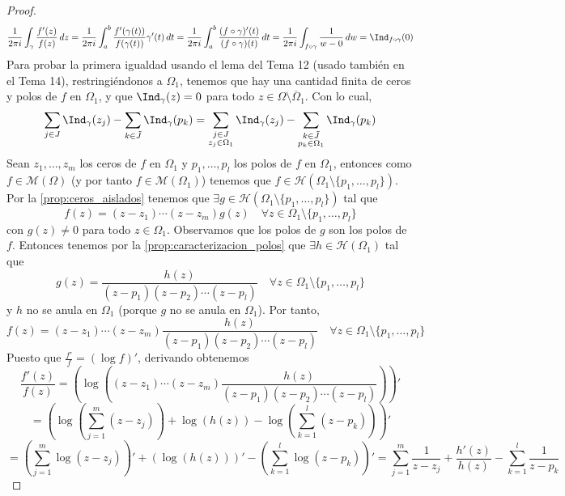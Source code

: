 \begin{proof}
    \[
        \frac{1}{2 \pi i} \int_{\gamma} \frac{f'(z)}{f(z)} \, dz = \frac{1}{2 \pi i} \int_{a}^{b} \frac{f'(\gamma(t))}{f(\gamma(t))} \gamma'(t) \, dt = \frac{1}{2 \pi i} \int_{a}^{b} \frac{(f \circ \gamma)'(t)}{(f \circ \gamma)(t)} \, dt = \frac{1}{2 \pi i} \int_{f \circ \gamma} \frac{1}{w - 0} \, dw = \Ind_{f \circ \gamma}(0)
    \]
    Para probar la primera igualdad usando el lema del Tema 12 (usado también en el Tema 14), restringiéndonos a $\Omega_1$, tenemos que hay una cantidad finita de ceros y polos de $f$ en $\Omega_1$, y que $\Ind_{\gamma}(z) = 0$ para todo $z \in \Omega \setminus \overline{\Omega}_1$. Con lo cual,
    \[
        \sum_{j \in J} \Ind_{\gamma}(z_j) - \sum_{k \in \tilde{J}} \Ind_{\gamma}(p_k) = \sum_{\substack{j \in J \\ z_j \in \Omega_1}} \Ind_{\gamma}(z_j) - \sum_{\substack{k \in \tilde{J} \\ p_k \in \Omega_1}} \Ind_{\gamma}(p_k)
    \]
    Sean $z_1, \ldots, z_m$ los ceros de $f$ en $\Omega_1$ y $p_1, \ldots, p_l$ los polos de $f$ en $\Omega_1$, entonces como $f \in \mathcal{M}(\Omega)$ (y por tanto $f \in \mathcal{M}(\Omega_1)$) tenemos que $f \in \mathcal{H}(\Omega_1 \setminus \{p_1, \ldots, p_l\})$. Por la \cref{prop:ceros_aislados} tenemos que $\exists g \in \mathcal{H}(\Omega_1 \setminus \{p_1, \ldots, p_l\})$ tal que
    \[
        f(z) = (z - z_1) \cdots (z - z_m) g(z)  \quad \forall z \in \Omega_1 \setminus \{p_1, \ldots, p_l\}
    \]  
    con $g(z) \neq 0$ para todo $z \in \Omega_1$. 
    Observamos que los polos de $g$ son los polos de $f$. Entonces tenemos por la \cref{prop:caracterizacion_polos} que $\exists h \in \mathcal{H}(\Omega_1)$ tal que
    \[
        g(z) = \frac{h(z)}{(z - p_1)(z - p_2) \cdots (z - p_l)} \quad \forall z \in \Omega_1 \setminus \{p_1, \ldots, p_l\}
    \]
    y $h$ no se anula en $\Omega_1$ (porque $g$ no se anula en $\Omega_1$). Por tanto,
    \[
        f(z) = (z-z_1) \cdots (z-z_m) \frac{h(z)}{(z - p_1)(z - p_2) \cdots (z - p_l)} \quad \forall z \in \Omega_1 \setminus \{p_1, \ldots, p_l\}
    \]
    Puesto que $\frac{f'}{f} = (\log f)'$, derivando obtenemos
    \[
        \frac{f'(z)}{f(z)} = \left( \log \left( (z-z_1) \cdots (z-z_m) \frac{h(z)}{(z - p_1)(z - p_2) \cdots (z - p_l)} \right) \right)'
    \]
    \[
        = \left( \log \left( \sum_{j=1}^{m} (z - z_j) \right) + \log(h(z)) - \log \left( \sum_{k=1}^{l} (z - p_k) \right) \right)' 
    \]
    \[
        = \left( \sum_{j=1}^{m} \log(z - z_j) \right)' + \left( \log(h(z)) \right)' - \left( \sum_{k=1}^{l} \log(z - p_k) \right)' 
        = \sum_{j=1}^{m} \frac{1}{z - z_j} + \frac{h'(z)}{h(z)} - \sum_{k=1}^{l} \frac{1}{z - p_k}
    \]
    

\end{proof}
